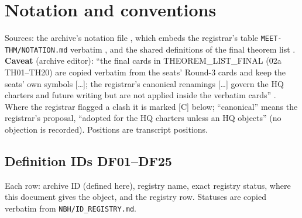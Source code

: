 \section{Notation and conventions}\label{app:notation}

Sources: the archive's notation file , which embeds the registrar's table
\texttt{MEET-THM/NOTATION.md} verbatim , and the shared definitions of the final
theorem list . \textbf{Caveat} (archive editor): ``the final cards in
THEOREM\_LIST\_FINAL (02a TH01–TH20) are copied verbatim from the seats' Round-3 cards and keep the seats' own symbols [\dots]; the
registrar's canonical renamings [\dots] govern the HQ charters and future writing but are not applied inside the verbatim cards''
. Where the registrar flagged a clash it is marked [C] below; ``canonical'' means the
registrar's proposal, ``adopted for the HQ charters unless an HQ objects'' (no objection is recorded). Positions  are
transcript positions.

\subsection{Definition IDs DF01--DF25}\label{app:notation-df}

Each row: archive ID (defined here), registry name, exact registry status, where this document gives the object, and the
registry row. Statuses are copied verbatim from \texttt{NBH/ID\_REGISTRY.md}.

